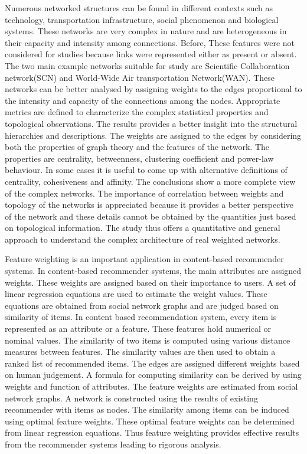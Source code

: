 Numerous networked structures can be found in different contexts such as technology, transportation infrastructure, social phenomenon and biological systems. These networks are very complex in nature and are heterogeneous in their capacity and intensity among connections. Before, These features were not considered for studies because links were represented either as present or absent. The two main example networks suitable for study are Scientific Collaboration network(SCN) and World-Wide Air transportation Network(WAN). These networks can be better analysed by assigning weights to the edges proportional to the intensity and capacity of the connections among the nodes. Appropriate metrics are defined to characterize the complex statistical properties and topological observations. The results provides a better insight into the structural hierarchies and descriptions.
The weights are assigned to the edges by considering both the properties of graph theory and the features of the network. The properties are centrality, betweenness, clustering coefficient and power-law behaviour. In some cases it is useful to come up with alternative definitions of centrality, cohesiveness and affinity. The conclusions show a more complete view of the complex networks. The importance of correlation between weights and topology of the networks is appreciated because it provides a better perspective of the network and these details cannot be obtained by the quantities just based on topological information. The study thus offers a quantitative and general approach to understand the complex architecture of real weighted networks.\cite{barrat2004architecture}

Feature weighting is an important application in content-based recommender systems. In content-based recommender systems, the main attributes are assigned weights. These weights are assigned based on their importance to users. A set of linear regression equations are used to estimate the weight values. These equations are obtained from social network graphs and are judged based on similarity of items.
In content based recommendation system, every item is represented as an attribute or a feature. These features hold numerical or nominal values. The similarity of two items is computed using various distance measures between features. The similarity values are then used to obtain a ranked list of recommended items. The edges are assigned different weights based on human judgement. A formula for computing similarity can be derived by using weights and function of attributes. The feature weights are estimated from social network graphs. A network is constructed using the results of existing recommender with items as nodes. The similarity among items can be induced using optimal feature weights. These optimal feature weights can be determined from linear regression equations. Thus feature weighting provides effective results from the recommender systems leading to rigorous analysis.\cite{debnath2008feature}

